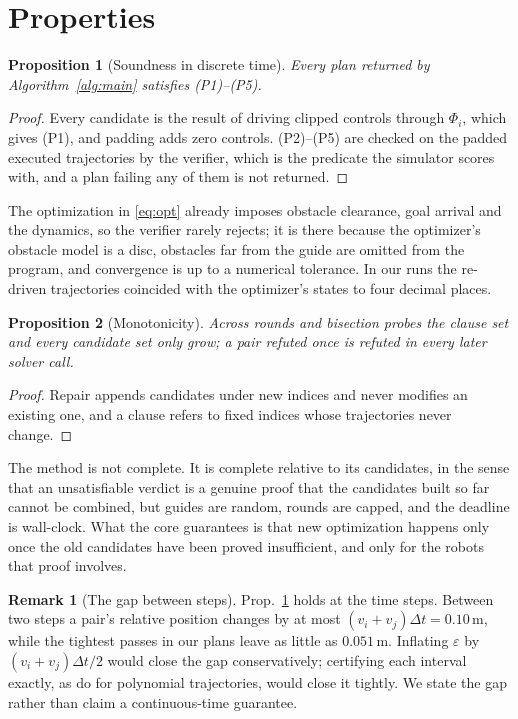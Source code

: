 \documentclass[conference]{IEEEtran}
\theoremstyle{plain}
\newtheorem{proposition}{Proposition}
\theoremstyle{definition}
\newtheorem{remark}{Remark}
\newcommand{\clr}{\varepsilon}
\begin{document}
\section{Properties}
\label{sec:properties}

\begin{proposition}[Soundness in discrete time]
\label{prop:sound}
Every plan returned by Algorithm~\ref{alg:main} satisfies (P1)--(P5).
\end{proposition}

\begin{proof}
Every candidate is the result of driving clipped controls through $\Phi_i$, which gives
(P1), and padding adds zero controls. (P2)--(P5) are checked on the padded executed
trajectories by the verifier, which is the predicate the simulator scores with, and a plan
failing any of them is not returned.
\end{proof}

The optimization in \eqref{eq:opt} already imposes obstacle clearance, goal arrival and the
dynamics, so the verifier rarely rejects; it is there because the optimizer's obstacle model
is a disc, obstacles far from the guide are omitted from the program, and convergence is up
to a numerical tolerance. In our runs the re-driven trajectories coincided with the
optimizer's states to four decimal places.

\begin{proposition}[Monotonicity]
\label{prop:monotone}
Across rounds and bisection probes the clause set and every candidate set only grow; a pair
refuted once is refuted in every later solver call.
\end{proposition}

\begin{proof}
Repair appends candidates under new indices and never modifies an existing one, and a clause
refers to fixed indices whose trajectories never change.
\end{proof}

The method is not complete. It is complete relative to its candidates, in the sense that an
unsatisfiable verdict is a genuine proof that the candidates built so far cannot be combined,
but guides are random, rounds are capped, and the deadline is wall-clock. What the core
guarantees is that new optimization happens only once the old candidates have been proved
insufficient, and only for the robots that proof involves.

\begin{remark}[The gap between steps]
\label{rem:gap}
Prop.~\ref{prop:sound} holds at the time steps. Between two steps a pair's relative position
changes by at most $(v_i + v_j)\Delta t = 0.10$\,m, while the tightest passes in our plans
leave as little as $0.051$\,m. Inflating $\clr$ by $(v_i + v_j)\Delta t/2$ would close the
gap conservatively; certifying each interval exactly, as \cite{parkkim2020} do for polynomial
trajectories, would close it tightly. We state the gap rather than claim a continuous-time
guarantee.
\end{remark}
\end{document}
